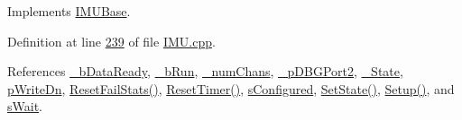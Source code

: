 Implements \hyperlink{class_i_m_u_base_af31c2ed51cd36cc3230ebbb58757784a}{IMUBase}.



Definition at line \hyperlink{_i_m_u_8cpp_source_l00239}{239} of file \hyperlink{_i_m_u_8cpp_source}{IMU.cpp}.



References \hyperlink{_i_m_u_8h_source_l00104}{\_\-bDataReady}, \hyperlink{_i_m_u_8h_source_l00107}{\_\-bRun}, \hyperlink{_i_m_u_8h_source_l00091}{\_\-numChans}, \hyperlink{_i_m_u_8h_source_l00113}{\_\-pDBGPort2}, \hyperlink{_i_m_u_8h_source_l00085}{\_\-State}, \hyperlink{_i_m_u_8h_source_l00057}{pWriteDn}, \hyperlink{_i_m_u_8h_source_l00200}{ResetFailStats()}, \hyperlink{_i_m_u_8cpp_source_l00702}{ResetTimer()}, \hyperlink{_i_m_u_8h_source_l00045}{sConfigured}, \hyperlink{_i_m_u_8h_source_l00178}{SetState()}, \hyperlink{_i_m_u_8cpp_source_l00194}{Setup()}, and \hyperlink{_i_m_u_8h_source_l00046}{sWait}.


